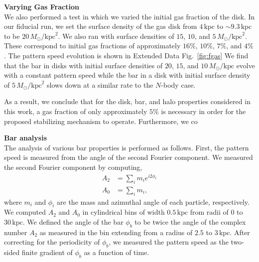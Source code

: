 \documentclass{natureprintstyle}
\newcommand{\Nbody}{$N$-body}
\newcommand{\Msun}{\ensuremath{M_{\odot}}}
\begin{document}
\vspace{12pt}

\noindent
{\bf Varying Gas Fraction}
\\
\noindent
We also performed a test in which we varied the initial gas fraction of the
disk. In our fiducial run, we set the surface density of the gas disk from
$4\,\textrm{kpc}$ to $\sim9.3\,\textrm{kpc}$ to be $20\,\Msun/\textrm{kpc}^2$.
We also ran with surface densities of $15$, $10$, and
$5\,\Msun/\textrm{kpc}^2$. These correspond to initial gas fractions of
approximately $16\%$, $10\%$, $7\%$, and $4\%$. The pattern speed evolution is
shown in Extended Data Fig.~\ref{fig:fgas} We find that the bar in disks with
initial surface densities of $20$, $15$, and $10\,\Msun/\textrm{kpc}$ evolve
with a constant pattern speed while the bar in a disk with initial surface
density of $5\,\Msun/\textrm{kpc}^2$ slows down at a similar rate to the \Nbody{} case.

As a result, we conclude that for the disk, bar, and halo properties
considered in this work, a gas fraction of only approximately $5\%$ is
necessary in order for the proposed stabilizing mechanism to operate. Furthermore, we co

\vspace{12pt}

\noindent
{\bf Bar analysis}
\\
\noindent
The analysis of various bar properties is performed as follows. First, the
pattern speed is measured from the angle of the second Fourier component. We
measured the second Fourier component by computing,
\begin{equation}
\begin{split}
A_2 &= \sum_i m_i e^{i 2 \phi_i} \\
A_0 &= \sum_i m_i \textrm{,}
\end{split}
\end{equation}
where $m_i$ and $\phi_i$ are the mass and azimuthal angle of each particle,
respectively. We computed $A_2$ and $A_0$ in cylindrical bins of width
$0.5\,\textrm{kpc}$ from radii of $0$ to $30\,\textrm{kpc}$. We defined the
angle of the bar $\phi_b$ to be twice the angle of the complex number $A_2$ as
measured in the bin extending from a radius of $2.5$ to $3\,\textrm{kpc}$.
After correcting for the periodicity of $\phi_b$, we measured the pattern
speed as the two-sided finite gradient of $\phi_b$ as a function of time.
\end{document}
